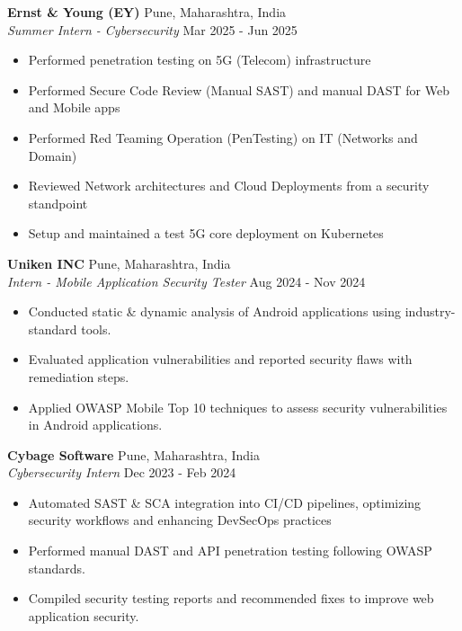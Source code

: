 \documentclass[a4paper]{article}
\begin{document}
\textbf{Ernst \& Young (EY)} \hfill Pune, Maharashtra, India\\
\textit{Summer Intern - Cybersecurity} \hfill Mar 2025 - Jun 2025\\
\vspace{-1mm}
\begin{itemize} \itemsep 1pt
	\item Performed penetration testing on 5G (Telecom) infrastructure
	\item Performed Secure Code Review (Manual SAST) and manual DAST for Web and Mobile apps
	\item Performed Red Teaming Operation (PenTesting) on IT (Networks and Domain)
	\item Reviewed Network architectures and Cloud Deployments from a security standpoint
	\item Setup and maintained a test 5G core deployment on Kubernetes
\end{itemize}
\textbf{Uniken INC} \hfill Pune, Maharashtra, India\\
\textit{Intern - Mobile Application Security Tester} \hfill Aug 2024 - Nov 2024\\
\vspace{-1mm}
\begin{itemize} \itemsep 1pt
	\item Conducted static \& dynamic analysis of Android applications using industry-standard tools.
	\item Evaluated application vulnerabilities and reported security flaws with remediation steps.
	\item Applied OWASP Mobile Top 10 techniques to assess security vulnerabilities in Android applications.
\end{itemize}
\textbf{Cybage Software} \hfill Pune, Maharashtra, India\\
\textit{Cybersecurity Intern} \hfill Dec 2023 - Feb 2024\\
\vspace{-1mm}
\begin{itemize} \itemsep 1pt
	\item Automated SAST \& SCA integration into CI/CD pipelines, optimizing security workflows and enhancing DevSecOps practices
	\item Performed manual DAST and API penetration testing following OWASP standards.
	\item Compiled security testing reports and recommended fixes to improve web application security.
\end{itemize}
\end{document}
